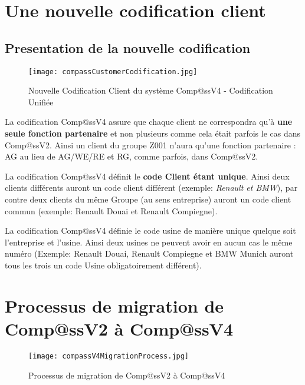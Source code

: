 \clearpage

\section{Une nouvelle codification client}

\subsection{Presentation de la nouvelle codification}

\begin{figure}[H]
    \centering
    \texttt{[image: compassCustomerCodification.jpg]}
	\caption{Nouvelle Codification Client du système Comp@ssV4 - Codification Unifiée}\label{image.compassCustomerCodification} 
\end{figure}

La codification Comp@ssV4 assure que chaque client ne correspondra qu'à\textbf{ une seule fonction partenaire} et non plusieurs comme cela était parfois le cas dans Comp@ssV2. Ainsi un client du groupe Z001 n'aura qu'une fonction partenaire : AG au lieu de AG/WE/RE et RG, comme parfois, dans Comp@ssV2.

La codification Comp@ssV4 définit le \textbf{code Client étant unique}. Ainsi deux clients différents auront un code client différent (exemple: \textit{Renault et BMW}), par contre deux clients du même Groupe (au sens entreprise) auront un code client commun (exemple: Renault Douai et Renault Compiegne).

La codification Comp@ssV4 définie le code usine de manière unique quelque soit l'entreprise et l'usine. Ainsi deux usines ne peuvent avoir en aucun cas le même numéro (Exemple: Renault Douai, Renault Compiegne et BMW Munich auront tous les trois un code Usine obligatoirement différent).

\section{Processus de migration de Comp@ssV2 à Comp@ssV4}

\begin{figure}[H]
    \centering
    \texttt{[image: compassV4MigrationProcess.jpg]}
	\caption{Processus de migration de Comp@ssV2 à Comp@ssV4}\label{image.compassV4MigrationProcess} 
\end{figure}


